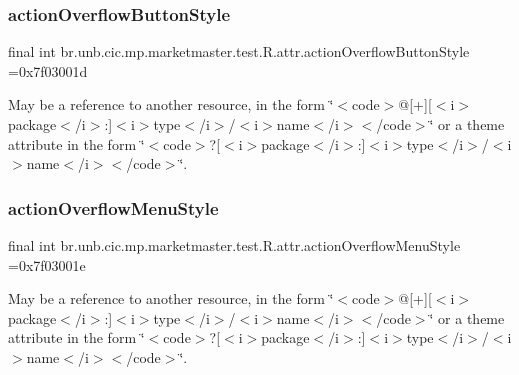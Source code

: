 \subsubsection{\texorpdfstring{action\+Overflow\+Button\+Style}{actionOverflowButtonStyle}}
{\footnotesize\ttfamily final int br.\+unb.\+cic.\+mp.\+marketmaster.\+test.\+R.\+attr.\+action\+Overflow\+Button\+Style =0x7f03001d\hspace{0.3cm}{\ttfamily [static]}}

May be a reference to another resource, in the form \char`\"{}$<$code$>$@\mbox{[}+\mbox{]}\mbox{[}$<$i$>$package$<$/i$>$\+:\mbox{]}$<$i$>$type$<$/i$>$/$<$i$>$name$<$/i$>$$<$/code$>$\char`\"{} or a theme attribute in the form \char`\"{}$<$code$>$?\mbox{[}$<$i$>$package$<$/i$>$\+:\mbox{]}$<$i$>$type$<$/i$>$/$<$i$>$name$<$/i$>$$<$/code$>$\char`\"{}. \mbox{\label{classbr_1_1unb_1_1cic_1_1mp_1_1marketmaster_1_1test_1_1R_1_1attr_a859e9f15960b76e06c68d80edc10c72d}} 
\subsubsection{\texorpdfstring{action\+Overflow\+Menu\+Style}{actionOverflowMenuStyle}}
{\footnotesize\ttfamily final int br.\+unb.\+cic.\+mp.\+marketmaster.\+test.\+R.\+attr.\+action\+Overflow\+Menu\+Style =0x7f03001e\hspace{0.3cm}{\ttfamily [static]}}

May be a reference to another resource, in the form \char`\"{}$<$code$>$@\mbox{[}+\mbox{]}\mbox{[}$<$i$>$package$<$/i$>$\+:\mbox{]}$<$i$>$type$<$/i$>$/$<$i$>$name$<$/i$>$$<$/code$>$\char`\"{} or a theme attribute in the form \char`\"{}$<$code$>$?\mbox{[}$<$i$>$package$<$/i$>$\+:\mbox{]}$<$i$>$type$<$/i$>$/$<$i$>$name$<$/i$>$$<$/code$>$\char`\"{}. \mbox{\label{classbr_1_1unb_1_1cic_1_1mp_1_1marketmaster_1_1test_1_1R_1_1attr_af0908ce60da6244a3c2b617167b33404}} 
